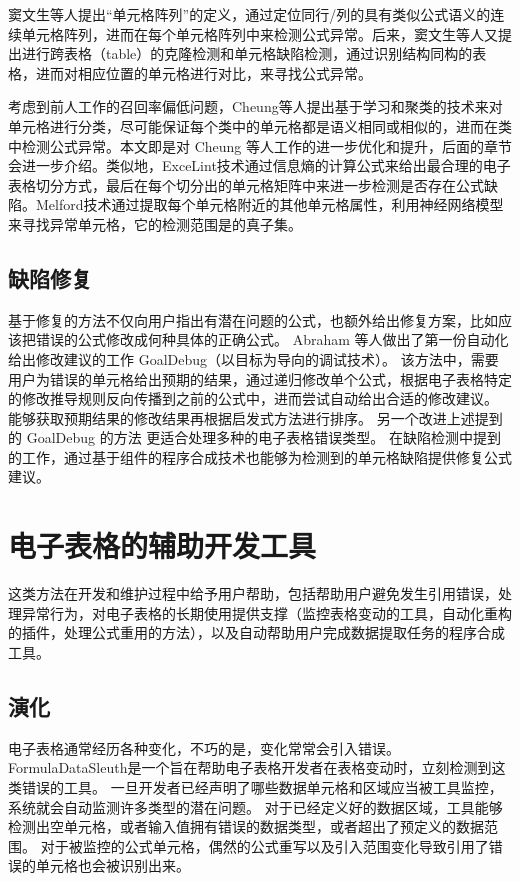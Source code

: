 窦文生等人\cite{dou2014spreadsheet,dou2017cacheck}提出“单元格阵列”的定义，通过定位同行/列的具有类似公式语义的连续单元格阵列，进而在每个单元格阵列中来检测公式异常。后来，窦文生等人\cite{dou2016detecting}又提出进行跨表格（table）的克隆检测和单元格缺陷检测，通过识别结构同构的表格，进而对相应位置的单元格进行对比，来寻找公式异常。

考虑到前人工作的召回率偏低问题，Cheung等人\cite{cheung2016custodes}提出基于学习和聚类的技术来对单元格进行分类，尽可能保证每个类中的单元格都是语义相同或相似的，进而在类中检测公式异常。本文即是对 Cheung 等人工作的进一步优化和提升，后面的章节会进一步介绍。类似地，ExceLint\cite{Barowy2018excelint}技术通过信息熵的计算公式来给出最合理的电子表格切分方式，最后在每个切分出的单元格矩阵中来进一步检测是否存在公式缺陷。Melford\cite{singh2017melford}技术通过提取每个单元格附近的其他单元格属性，利用神经网络模型来寻找异常单元格，它的检测范围是\cu \cite{cheung2016custodes}的真子集。

\subsection{缺陷修复}
基于修复的方法不仅向用户指出有潜在问题的公式，也额外给出修复方案，比如应该把错误的公式修改成何种具体的正确公式。
Abraham 等人\cite{abraham2005goal}做出了第一份自动化给出修改建议的工作 GoalDebug（以目标为导向的调试技术）。
该方法中，需要用户为错误的单元格给出预期的结果，通过递归修改单个公式，根据电子表格特定的修改推导规则反向传播到之前的公式中，进而尝试自动给出合适的修改建议。
能够获取预期结果的修改结果再根据启发式方法进行排序。
另一个改进上述提到的 GoalDebug 的方法 \cite{abraham2007goaldebug,abraham2008mutation} 更适合处理多种的电子表格错误类型。
在缺陷检测中提到的工作\ca \cite{dou2014spreadsheet,dou2017cacheck}，通过基于组件的程序合成技术\cite{jha2010oracle}也能够为检测到的单元格缺陷提供修复公式建议。


\section{电子表格的辅助开发工具}

这类方法在开发和维护过程中给予用户帮助，包括帮助用户避免发生引用错误，处理异常行为，对电子表格的长期使用提供支撑（监控表格变动的工具，自动化重构的插件，处理公式重用的方法），以及自动帮助用户完成数据提取任务的程序合成工具。

\subsection{演化}
电子表格通常经历各种变化，不巧的是，变化常常会引入错误。
FormulaDataSleuth\cite{bekenn2008reducing}是一个旨在帮助电子表格开发者在表格变动时，立刻检测到这类错误的工具。
一旦开发者已经声明了哪些数据单元格和区域应当被工具监控，系统就会自动监测许多类型的潜在问题。
对于已经定义好的数据区域，工具能够检测出空单元格，或者输入值拥有错误的数据类型，或者超出了预定义的数据范围。
对于被监控的公式单元格，偶然的公式重写以及引入范围变化导致引用了错误的单元格也会被识别出来。

